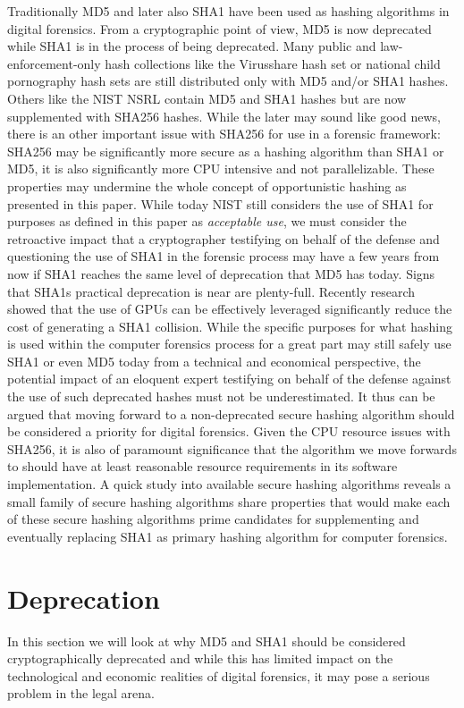 Traditionally MD5 and later also SHA1 have been used as hashing algorithms in digital forensics. From a cryptographic point of view, MD5 is now deprecated while SHA1 is in the process of being deprecated. Many public and law-enforcement-only hash collections like the Virusshare hash set or national child pornography hash sets are still distributed only with MD5 and/or SHA1 hashes. Others like the NIST NSRL contain MD5 and SHA1 hashes but are now supplemented with SHA256 hashes. While the later may sound like good news, there is an other important issue with SHA256 for use in a forensic framework: SHA256 may be significantly more secure as a hashing algorithm than SHA1 or MD5, it is also significantly more CPU intensive and not parallelizable. These properties may undermine the whole concept of opportunistic hashing as presented in this paper. While today NIST still considers the use of SHA1 for purposes as defined in this paper as \emph{acceptable use}, we must consider the retroactive impact that a cryptographer testifying on behalf of the defense and questioning the use of SHA1 in the forensic process may have a few years from now if SHA1 reaches the same level of deprecation that MD5 has today. Signs that SHA1s practical deprecation is near are plenty-full. Recently research showed that the use of GPUs can be effectively leveraged significantly reduce the cost of generating a SHA1 collision. While the specific purposes for what hashing is used within the computer forensics process for a great part may still safely use SHA1 or even MD5 today from a technical and economical perspective, the potential impact of an eloquent expert testifying on behalf of the defense against the use of such deprecated hashes must not be underestimated. It thus can be argued that moving forward to a non-deprecated secure hashing algorithm should be considered a priority for digital forensics.  Given the CPU resource issues with SHA256, it is also of paramount significance that the algorithm we move forwards to should have at least reasonable resource requirements in its software implementation. A quick study into available secure hashing algorithms reveals a small family of secure hashing algorithms share properties that would make each of these secure hashing algorithms prime candidates for supplementing and eventually replacing SHA1 as primary hashing algorithm for computer forensics.

\section{Deprecation}
In this section we will look at why MD5 and SHA1 should be considered cryptographically deprecated and while this has limited impact on the technological and economic realities of digital forensics, it may pose a serious problem in the legal arena.
